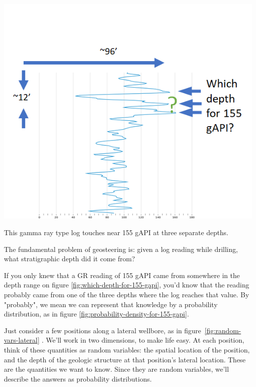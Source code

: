 \documentclass{tufte-handout}
\begin{document}
\begin{marginfigure}
  \includegraphics{which-depth-for-155-gapi.png}
  \caption{This gamma ray type log touches near 155 gAPI at three separate depths.}
  \label{fig:which-depth-for-155-gapi}
\end{marginfigure}

The fundamental problem of geosteering is: given a log reading while drilling, what stratigraphic depth did it come from?

If you only knew that a GR reading of 155 gAPI came from somewhere in the depth range on figure
\ref{fig:which-depth-for-155-gapi}, you'd know that the reading probably came from one of the three depths where the log reaches that value. By "probably", we mean we can represent that knowledge by a
probability distribution, as in figure \ref{fig:probability-density-for-155-gapi}. 






Just consider a few positions along a lateral wellbore, as in figure~\ref{fig:random-vars-lateral} . We'll work in
two dimensions, to make life easy. At each position,
think of these quantities as random variables: the spatial location
of the position, and the depth of the geologic structure at that position's lateral location.
These are the quantities we want to know. Since they are random variables, we'll describe the
answers as probability distributions. 
\end{document}
